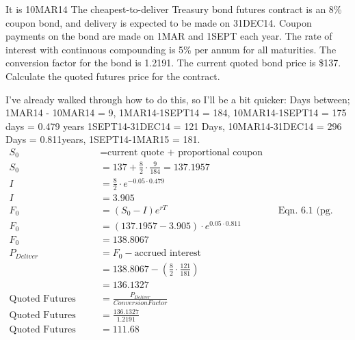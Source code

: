 \documentclass[12pt]{article}
\newenvironment{problem}[3][Problem]{\begin{trivlist}
\item[\hskip \labelsep {\bfseries #1}\hskip \labelsep {\bfseries #2.}]}{\end{trivlist}}
\begin{document}
\newpage
\begin{problem}{6.27}. It is 10MAR14 The cheapest-to-deliver Treasury bond futures contract is an 8\% coupon bond, and delivery is expected to be made on 31DEC14. Coupon payments on the bond are made on 1MAR and 1SEPT each year.
The rate of interest with continuous compounding is 5\% per annum for all maturities. The
conversion factor for the bond is 1.2191. The current quoted bond price is \$137. Calculate
the quoted futures price for the contract. 

I\rq{}ve already walked through how to do this, so I\rq{}ll be a bit quicker: Days between; 1MAR14 - 10MAR14 = 9, 1MAR14-1SEPT14 = 184, 10MAR14-1SEPT14 = 175 days = 0.479 years 1SEPT14-31DEC14 = 121 Days, 10MAR14-31DEC14 = 296 Days = 0.811years,  1SEPT14-1MAR15 = 181. 
\begin{align*}
S_0 &= \text{current quote + proportional coupon} \\ 
S_0 &= 137 + \frac{8}{2} \cdot \frac{9}{184} = 137.1957 \\
I &= \frac{8}{2} \cdot e^{-0.05 \cdot 0.479} \\
I &= 3.905 \\
F_0 &= (S_0 - I)e^{rT}  && \text{ Eqn. 6.1 (pg. 141)} \\
F_0&= (  137.1957  -  3.905) \cdot e^{0.05 \cdot 0.811} \\ 
F_0 &= 138.8067\\ 
P_{Deliver} &= F_0 - \text{accrued interest} \\ 
&= 138.8067 - (\frac{8}{2} \cdot \frac{121}{181}) \\
&= 136.1327 \\ 
\text{Quoted Futures Price} &= \frac{P_{Deliver}}{Conversion Factor} \\
\text{Quoted Futures Price}  &= \frac{136.1327 }{1.2191} \\
\text{Quoted Futures Price} & = 111.68
\end{align*}
\end{problem}
\end{document}
